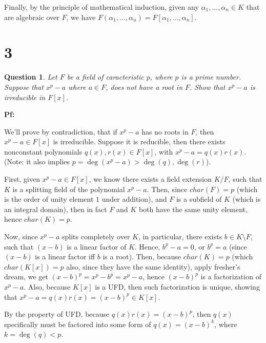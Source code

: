 \documentclass{article}
\newtheorem{question}{Question}
\begin{document}
\hfil

Finally, by the principle of mathematical induction, given any $\alpha_1,...,\alpha_n\in K$ that are algebraic over $F$, we have $F(\alpha_1,...,\alpha_n)=F[\alpha_1,...,\alpha_n]$.

\break

\section*{3}
\begin{myBox}[]{}
    \begin{question}
        Let $F$ be a field of caracteristic $p$, where $p$ is a prime number. Suppose that $x^p-a$ where $a\in F$, does not have a root in $F$. 
        Show that $x^p-a$ is irreducible in $F[x]$.
    \end{question}
\end{myBox}

\textbf{Pf:}

We'll prove by contradiction, that if $x^p-a$ has no roots in $F$, then $x^p-a\in F[x]$ is irreducible. Suppose it is reducible, then there exists nonconstant polynomials $q(x),r(x)\in F[x]$, with $x^p-a=q(x)r(x)$.
(Note: it also implies $p=\deg(x^p-a)>\deg(q),\deg(r)$).

\hfil

First, given $x^p-a\in F[x]$, we know there exists a field extension $K/F$, such that $K$ is a splitting field of the polynomial $x^p-a$. 
Then, since $char(F)=p$ (which is the order of unity element $1$ under addition), and $F$ is a subfield of $K$ (which is an integral domain), 
then in fact $F$ and $K$ both have the same unity element, hence $char(K)=p$.

Now, since $x^p-a$ splits completely over $K$, in particular, there exists $b\in K\setminus F$, such that $(x-b)$ is a linear factor of $K$. Hence, $b^p-a=0$, or $b^p=a$ (since $(x-b)$ is a linear factor iff $b$ is a root).
Then, because $char(K)=p$ (which $char(K[x])=p$ also, since they have the same identity), apply fresher's dream, we get $(x-b)^p=x^p-b^p=x^p-a$, hence $(x-b)^p$ is a factorization of $x^p-a$.
Also, because $K[x]$ is a UFD, then such factorization is unique, showing that $x^p-a=q(x)r(x)=(x-b)^p \in K[x]$.

\hfil

By the property of UFD, because $q(x)r(x)=(x-b)^p$, then $q(x)$ specifically must be factored into some form of $q(x)=(x-b)^k$, where $k=\deg(q)<p$.
\end{document}
